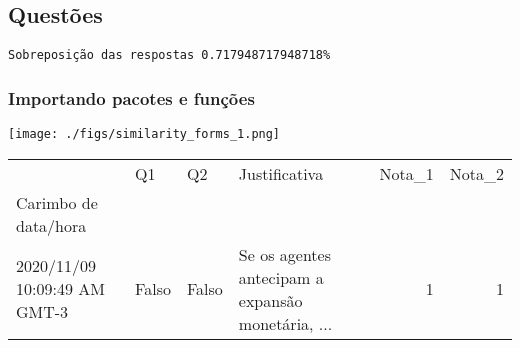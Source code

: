 \documentclass[11pt]{article}
\begin{document}
\subsection{Questões}
\label{sec:orgc21cc48}

\begin{verbatim}
Sobreposição das respostas 0.717948717948718%
\end{verbatim}

\subsubsection{Importando pacotes e funções}
\label{sec:org1e9f496}

\begin{center}
\texttt{[image: ./figs/similarity\_forms\_1.png]}
\end{center}


\begin{tabular}{llllrr}
\toprule
{} &     Q1 &     Q2 &                                      Justificativa &  Nota\_1 &  Nota\_2 \\
Carimbo de data/hora         &        &        &                                                    &         &         \\
\midrule
2020/11/09 10:09:49 AM GMT-3 &  Falso &  Falso &  Se os agentes antecipam a expansão monetária, ... &       1 &       1 \\
\bottomrule
\end{tabular}
\end{document}
